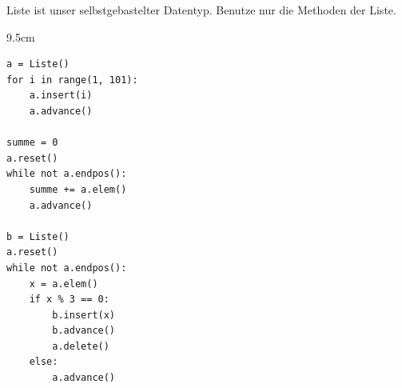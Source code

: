 \question[6]
Liste ist unser selbstgebastelter Datentyp. Benutze nur die Methoden der Liste.
\begin{solutionbox}{9.5cm}
\begin{lstlisting}
a = Liste()
for i in range(1, 101):
    a.insert(i)
    a.advance()

summe = 0
a.reset()
while not a.endpos():
    summe += a.elem()
    a.advance()

b = Liste()
a.reset()
while not a.endpos():
    x = a.elem()
    if x % 3 == 0:
        b.insert(x)
        b.advance()
        a.delete()
    else:
        a.advance()
\end{lstlisting}
\end{solutionbox}

